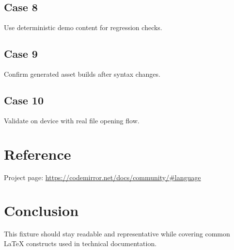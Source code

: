 \documentclass[11pt,a4paper]{article}
\begin{document}
\subsection{Case 8}
Use deterministic demo content for regression checks.

\subsection{Case 9}
Confirm generated asset builds after syntax changes.

\subsection{Case 10}
Validate on device with real file opening flow.

\section{Reference}
Project page: \url{https://codemirror.net/docs/community/#language}

\section{Conclusion}
This fixture should stay readable and representative while covering common
LaTeX constructs used in technical documentation.
\end{document}
